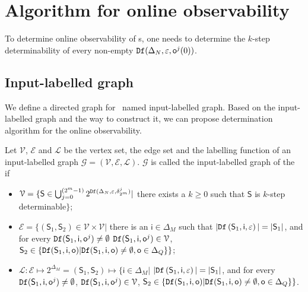 
\section{Algorithm for online observability}
\label{sec:deter}
To  determine  online observability of \BCN s, one needs to determine the $k$-step determinability of every non-empty ${\tt Df}(\Delta_N,\varepsilon, \mathsf{o}^{j}(0))$. 

\subsection{Input-labelled graph}
We define a directed graph for \BCN\ named input-labelled graph. Based on the input-labelled graph and the way to construct it, we can propose determination algorithm for the online observability.

\begin{definition}
Let $\mathcal{V}$, $\mathcal{E}$ and $\mathcal{L}$ be the vertex set, the edge set and the labelling function of an input-labelled graph $\mathcal{G}=(\mathcal{V}, \mathcal{E}, \mathcal{L})$. $\mathcal{G}$ is called the input-labelled graph of the \BCN\, if 
\begin{itemize}
\item  $\mathcal{V}=\{\mathsf{S}\in\bigcup_{j=0}^{(2^m -1)} 2^{{\tt Df}(\Delta_N,\varepsilon,\delta^j_{2^m} )}|$ there exists a $k\ge0$ such that $\mathsf{S}$ is $k$-step determinable$\}$;
\item  $\mathcal{E}=\{(\mathsf{S}_1,\mathsf{S}_2)\in \mathcal{V}\times \mathcal{V}|$ there is an $\mathsf{i} \in \Delta_M$ such that $|{\tt Df}\left(\mathsf{S}_1,\mathsf{i},\varepsilon\right)|=|\mathsf{S}_1|$, and for every ${\tt Df}(\mathsf{S}_1,\mathsf{i},\mathsf{o}^{j})\neq \emptyset$ ${\tt Df}(\mathsf{S}_1,\mathsf{i},\mathsf{o}^{j})\in \mathcal{V}$, $\mathsf{S}_2\in\{{\tt Df}(\mathsf{S}_1,\mathsf{i},\mathsf{o})| {\tt Df}(\mathsf{S}_1,\mathsf{i},\mathsf{o})\neq \emptyset, \mathsf{o}\in \Delta_Q\}\}$;
\item  $\mathcal{L}:\mathcal{E}\mapsto 2^{\Delta_M}=(\mathsf{S}_1,\mathsf{S}_2)\mapsto\{\mathsf{i}\in \Delta_M|$ $|{\tt Df}\left(\mathsf{S}_1,\mathsf{i},\varepsilon\right)|=|\mathsf{S}_1|$, and for every ${\tt Df}(\mathsf{S}_1,\mathsf{i},\mathsf{o}^{j})\neq \emptyset$, ${\tt Df}(\mathsf{S}_1,\mathsf{i},\mathsf{o}^{j})\in \mathcal{V}$, $\mathsf{S}_2\in\{{\tt Df}(\mathsf{S}_1,\mathsf{i},\mathsf{o})| {\tt Df}(\mathsf{S}_1,\mathsf{i},\mathsf{o})\neq \emptyset, \mathsf{o}\in \Delta_Q\}\}$.
 \end{itemize}
\end{definition}

